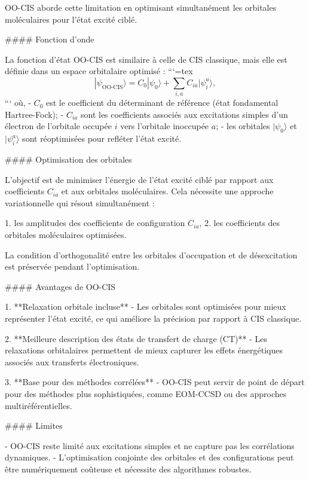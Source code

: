 \documentclass[12pt,a4paper]{report}
\numberwithin{equation}{section}
\numberwithin{figure}{section}
\numberwithin{table}{section}
\begin{document}
\begin{markdown}
OO-CIS aborde cette limitation en optimisant simultanément les orbitales moléculaires pour l’état excité ciblé.

#### Fonction d'onde

La fonction d'état OO-CIS est similaire à celle de CIS classique, mais elle est définie dans un espace orbitalaire optimisé :
```{=tex}
\begin{equation}
|\psi_{\text{OO-CIS}}\rangle = C_0 |\psi_0\rangle + \sum_{i,a} C_{ia} |\psi_i^a\rangle ,
\end{equation}
```
où,
- $C_0$ est le coefficient du déterminant de référence (état fondamental Hartree-Fock);
- $C_{ia}$ sont les coefficients associés aux excitations simples d'un électron de l'orbitale occupée $i$ vers l'orbitale inoccupée $a$;
- les orbitales $|\psi_0\rangle$ et $|\psi_i^a\rangle$ sont réoptimisées pour refléter l'état excité.

#### Optimisation des orbitales

L’objectif est de minimiser l'énergie de l'état excité ciblé par rapport aux coefficients $C_{ia}$ et aux orbitales moléculaires. Cela nécessite une approche variationnelle qui résout simultanément :

1. les amplitudes des coefficients de configuration $C_{ia}$,
2. les coefficients des orbitales moléculaires optimisées.

La condition d’orthogonalité entre les orbitales d’occupation et de désexcitation est préservée pendant l’optimisation.

#### Avantages de OO-CIS

1. **Relaxation orbitale incluse**
   - Les orbitales sont optimisées pour mieux représenter l'état excité, ce qui améliore la précision par rapport à CIS classique.

2. **Meilleure description des états de transfert de charge (CT)**
   - Les relaxations orbitalaires permettent de mieux capturer les effets énergétiques associés aux transferts électroniques.

3. **Base pour des méthodes corrélées**
   - OO-CIS peut servir de point de départ pour des méthodes plus sophistiquées, comme EOM-CCSD ou des approches multiréférentielles.

#### Limites

- OO-CIS reste limité aux excitations simples et ne capture pas les corrélations dynamiques.
- L'optimisation conjointe des orbitales et des configurations peut être numériquement coûteuse et nécessite des algorithmes robustes.


\end{markdown}
\end{document}
